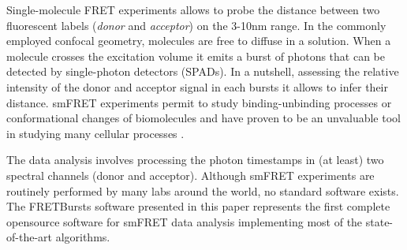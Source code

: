 
Single-molecule FRET experiments allows to probe the distance between two fluorescent labels (\textit{donor} and \textit{acceptor}) on the 3-10nm range. In the commonly employed confocal geometry, molecules are free to diffuse in a solution. When a molecule crosses the excitation volume it emits a burst of photons that can be detected by single-photon detectors (SPADs). In a nutshell, assessing the relative intensity of the donor and acceptor signal in each bursts it allows to infer their distance. smFRET experiments permit to study binding-unbinding processes or conformational changes of biomolecules and have proven to be an unvaluable tool in studying many cellular processes \cite{Kapanidis_2006}.

The data analysis involves processing the photon timestamps in (at least) two spectral channels (donor and acceptor). 
Although smFRET experiments are routinely performed by many labs around the world, no standard software exists. The FRETBursts software presented in this paper represents the first complete opensource software for smFRET data analysis implementing most of the state-of-the-art algorithms. 
